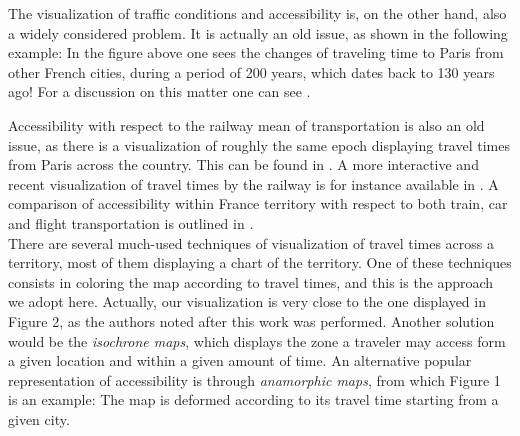 \documentclass{vgtc}                          %
\begin{document}
The visualization of traffic conditions and accessibility is, on the other hand, also a widely considered problem. It is actually an old issue, as shown in the following example: In the figure above one sees the changes of traveling time to Paris from other French cities, during a period of 200 years, which dates back to 130 years ago! For a discussion on this matter one can see \cite{schoedon2016interactive}.


Accessibility with respect to the railway mean of transportation is also an old issue, as there is a visualization of roughly the same epoch displaying travel times from Paris across the country. This can be found in \cite{vieillecartetrains}. A more interactive and recent visualization of travel times by the railway is for instance available in \cite{LeMonde1}. A comparison of accessibility within France territory with respect to both train, car and flight transportation is outlined in \cite{sauvant2002}.\\




There are several much-used techniques of visualization of travel times across a territory, most of them displaying a chart of the territory. One of these techniques consists in coloring the map according to travel times, and this is the approach we adopt here. Actually, our visualization is very close to the one displayed in Figure 2, as the authors noted after this work was performed. Another solution would be the \textit{isochrone maps}, which displays the zone a traveler may access form a given location and within a given amount of time. An alternative popular representation of accessibility is through \textit{anamorphic maps}, from which Figure 1 is an example: The map is deformed according to its travel time starting from a given city.  
\end{document}
